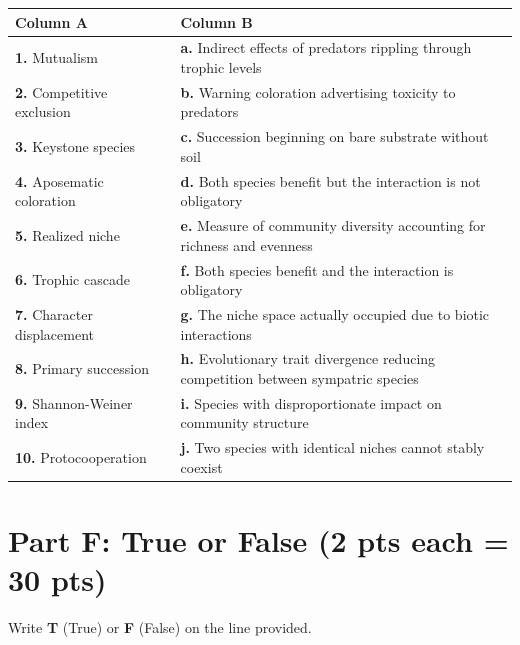 \documentclass[11pt]{article}
\begin{document}
\vspace{0.3cm}
\begin{tabular}{p{} p{} p{}}
\toprule
\textbf{Column A} & & \textbf{Column B} \\
\midrule
\textbf{1.} Mutualism & \underline{\phantom{XX}} & \textbf{a.} Indirect effects of predators rippling through trophic levels \\[0.3cm]
\textbf{2.} Competitive exclusion & \underline{\phantom{XX}} & \textbf{b.} Warning coloration advertising toxicity to predators \\[0.3cm]
\textbf{3.} Keystone species & \underline{\phantom{XX}} & \textbf{c.} Succession beginning on bare substrate without soil \\[0.3cm]
\textbf{4.} Aposematic coloration & \underline{\phantom{XX}} & \textbf{d.} Both species benefit but the interaction is not obligatory \\[0.3cm]
\textbf{5.} Realized niche & \underline{\phantom{XX}} & \textbf{e.} Measure of community diversity accounting for richness and evenness \\[0.3cm]
\textbf{6.} Trophic cascade & \underline{\phantom{XX}} & \textbf{f.} Both species benefit and the interaction is obligatory \\[0.3cm]
\textbf{7.} Character displacement & \underline{\phantom{XX}} & \textbf{g.} The niche space actually occupied due to biotic interactions \\[0.3cm]
\textbf{8.} Primary succession & \underline{\phantom{XX}} & \textbf{h.} Evolutionary trait divergence reducing competition between sympatric species \\[0.3cm]
\textbf{9.} Shannon-Weiner index & \underline{\phantom{XX}} & \textbf{i.} Species with disproportionate impact on community structure \\[0.3cm]
\textbf{10.} Protocooperation & \underline{\phantom{XX}} & \textbf{j.} Two species with identical niches cannot stably coexist \\[0.3cm]
\bottomrule
\end{tabular}

\clearpage

\section*{Part F: True or False (2 pts each = 30 pts)}
Write \textbf{T} (True) or \textbf{F} (False) on the line provided.
\end{document}
